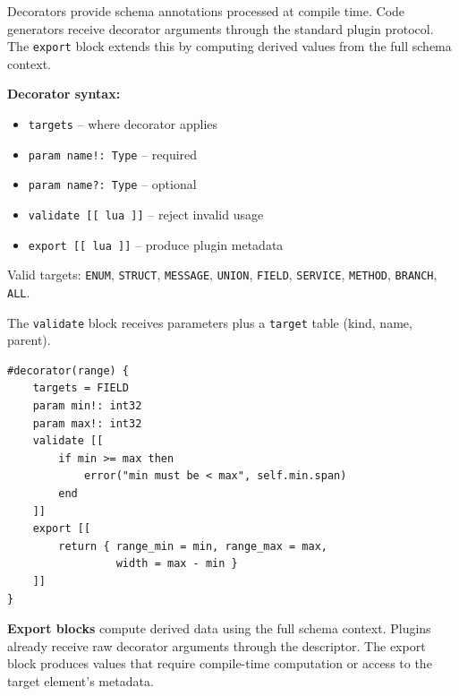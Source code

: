 \documentclass[10pt,onecolumn]{article}
\begin{document}
\begin{minipage}{\textwidth}
Decorators provide schema annotations processed at compile time. Code generators receive decorator arguments through the standard plugin protocol. The \texttt{export} block extends this by computing derived values from the full schema context.

\vspace{4pt}
\begin{minipage}[t]{0.44\textwidth}
\small
\textbf{Decorator syntax:}
\begin{itemize}[leftmargin=1.2em,itemsep=0pt,topsep=2pt]
\item \texttt{targets} -- where decorator applies
\item \texttt{param name!: Type} -- required
\item \texttt{param name?: Type} -- optional
\item \texttt{validate [[ lua ]]} -- reject invalid usage
\item \texttt{export [[ lua ]]} -- produce plugin metadata
\end{itemize}

\vspace{2pt}
{\footnotesize Valid targets: \texttt{ENUM}, \texttt{STRUCT}, \texttt{MESSAGE}, \texttt{UNION}, \texttt{FIELD}, \texttt{SERVICE}, \texttt{METHOD}, \texttt{BRANCH}, \texttt{ALL}.}

\vspace{4pt}
The \texttt{validate} block receives parameters plus a \texttt{target} table (kind, name, parent).
\end{minipage}\hfill
\begin{minipage}[t]{0.52\textwidth}
\begin{lstlisting}[language=bebop,aboveskip=0pt,belowskip=0pt,basicstyle=\ttfamily\footnotesize]
#decorator(range) {
    targets = FIELD
    param min!: int32
    param max!: int32
    validate [[
        if min >= max then
            error("min must be < max", self.min.span)
        end
    ]]
    export [[
        return { range_min = min, range_max = max,
                 width = max - min }
    ]]
}
\end{lstlisting}
\end{minipage}

\vspace{6pt}
\textbf{Export blocks} compute derived data using the full schema context. Plugins already receive raw decorator arguments through the descriptor. The export block produces values that require compile-time computation or access to the target element's metadata.


\end{minipage}
\end{document}

